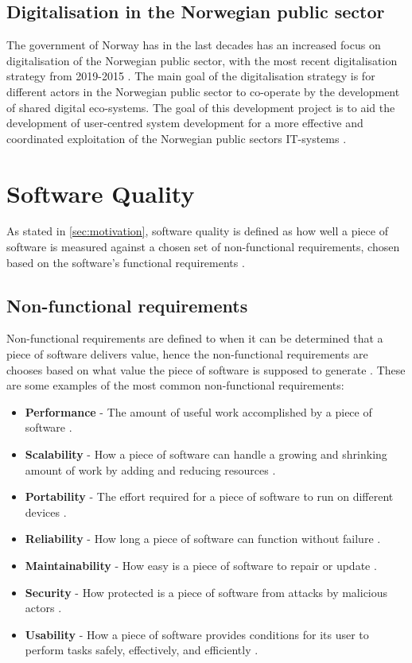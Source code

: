 \subsection{Digitalisation in the Norwegian public sector}
The government of Norway has in the last decades has an increased focus on digitalisation of the Norwegian public sector, with the most recent digitalisation strategy from 2019-2015 \cite{r_2019}. The main goal of the digitalisation strategy is for different actors in the Norwegian public sector to co-operate by the development of shared digital eco-systems. The goal of this development project is to aid the development of user-centred system development for a more effective and coordinated exploitation of the Norwegian public sectors IT-systems \cite{r_2019}.

\section{Software Quality}
As stated in \autoref{sec:motivation}, software quality is defined as how well a piece of software is measured against a chosen set of non-functional requirements, chosen based on the software's functional requirements \cite{iso_25010:2011}. 

\subsection{Non-functional requirements} \label{sec:non_functional_requirments}
Non-functional requirements are defined to when it can be determined that a piece of software delivers value, hence the non-functional requirements are chooses based on what value the piece of software is supposed to generate \cite{iso_25010:2011}. These are some examples of the most common non-functional requirements:

\begin{itemize}
    \item \textbf{Performance} - The amount of useful work accomplished by a piece of software \cite{performance_wiki_2023}.
    \item \textbf{Scalability} - How a piece of software can handle a growing and shrinking amount of work by adding and reducing resources \cite{scalability_wiki_2023}. 
    \item \textbf{Portability} - The effort required for a piece of software to run on different devices \cite{portability_wiki_2023}.
    \item \textbf{Reliability} - How long a piece of software can function without failure \cite{reliability_wiki_2023}.
    \item \textbf{Maintainability} - How easy is a piece of software to repair or update \cite{maintainability_wiki_2023}. 
    \item \textbf{Security} - How protected is a piece of software from attacks by malicious actors \cite{security_wiki_2023}.
    \item \textbf{Usability} - How a piece of software provides conditions for its user to perform tasks safely, effectively, and efficiently \cite{usability_wiki_2023}.
\end{itemize}

